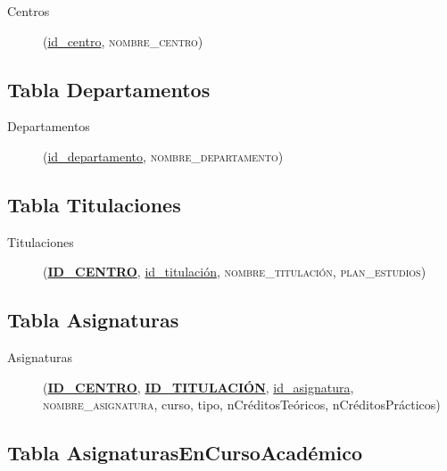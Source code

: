      \begin{description}
         \item[Centros] \begin{flushleft}(\underline{id\_centro},
         \textsc{nombre\_centro})\end{flushleft}
      \end{description}

   \subsection{Tabla Departamentos}

      \begin{description}
         \item[Departamentos] \begin{flushleft}(\underline{id\_departamento},
         \textsc{nombre\_departamento})\end{flushleft}
      \end{description}

   \subsection{Tabla Titulaciones}

      \begin{description}
         \item[Titulaciones] \begin{flushleft}(\underline{\textbf{ID\_CENTRO}},
         \underline{id\_titulación}, \textsc{nombre\_titulación},
         \textsc{plan\_estudios})\end{flushleft}
      \end{description}

   \subsection{Tabla Asignaturas}

      \begin{description}
         \item[Asignaturas] \begin{flushleft}(\underline{\textbf{ID\_CENTRO}},
         \underline{\textbf{ID\_TITULACIÓN}}, \underline{id\_asignatura},
         \textsc{nombre\_asignatura}, curso, tipo, nCréditosTeóricos,
         nCréditosPrácticos)\end{flushleft}
      \end{description}

  \subsection{Tabla AsignaturasEnCursoAcadémico}

